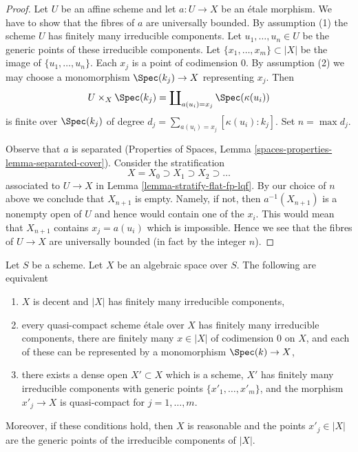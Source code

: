 \begin{proof}
Let $U$ be an affine scheme and let $a : U \to X$ be an \'etale morphism.
We have to show that the fibres of $a$ are universally bounded. By
assumption (1) the scheme $U$ has finitely many irreducible components.
Let $u_1, \ldots, u_n \in U$ be the generic points of these irreducible
components. Let $\{x_1, \ldots, x_m\} \subset |X|$ be the image
of $\{u_1, \ldots, u_n\}$. Each $x_j$ is a point of codimension $0$.
By assumption (2) we may choose a monomorphism $\Spec(k_j) \to X$
representing $x_j$. Then
$$
U \times_X \Spec(k_j) = \coprod\nolimits_{a(u_i) = x_j} \Spec(\kappa(u_i))
$$
is finite over $\Spec(k_j)$ of degree
$d_j = \sum_{a(u_i) = x_j} [\kappa(u_i) : k_j]$. Set $n = \max d_j$.

\medskip\noindent
Observe that $a$ is separated
(Properties of Spaces, Lemma \ref{spaces-properties-lemma-separated-cover}).
Consider the stratification
$$
X = X_0 \supset X_1 \supset X_2 \supset \ldots
$$
associated to $U \to X$ in Lemma \ref{lemma-stratify-flat-fp-lqf}.
By our choice of $n$ above we conclude that $X_{n + 1}$ is empty.
Namely, if not, then $a^{-1}(X_{n + 1})$ is a nonempty open
of $U$ and hence would contain one of the $x_i$. This would mean
that $X_{n + 1}$ contains $x_j = a(u_i)$ which is impossible.
Hence we see that the fibres of $U \to X$ are universally bounded
(in fact by the integer $n$).
\end{proof}

\begin{lemma}
\label{lemma-finitely-many-irreducible-components}
Let $S$ be a scheme. Let $X$ be an algebraic space over $S$.
The following are equivalent
\begin{enumerate}
\item $X$ is decent and $|X|$ has finitely many irreducible components,
\item every quasi-compact scheme \'etale over $X$ has finitely many
irreducible components, there are finitely many $x \in |X|$ of
codimension $0$ on $X$, and each of these can be represented
by a monomorphism $\Spec(k) \to X$,
\item there exists a dense open $X' \subset X$ which is
a scheme, $X'$ has finitely many irreducible components
with generic points $\{x'_1, \ldots, x'_m\}$, and
the morphism $x'_j \to X$ is quasi-compact for $j = 1, \ldots, m$.
\end{enumerate}
Moreover, if these conditions hold, then $X$ is reasonable and the
points $x'_j \in |X|$ are the generic points of the irreducible
components of $|X|$.
\end{lemma}

